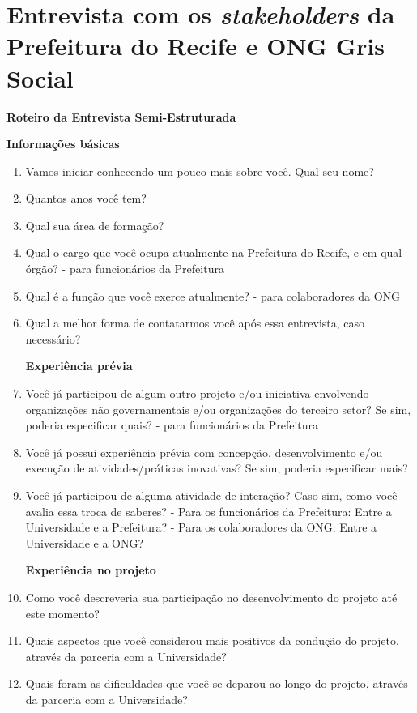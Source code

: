 \chapter{Entrevista com os \textit{stakeholders} da Prefeitura do Recife e ONG Gris Social} 
\textbf{Roteiro da Entrevista Semi-Estruturada}
\par\vspace{0.5\baselineskip}
\textbf{Informações básicas}
\begin{enumerate}
    \item Vamos iniciar conhecendo um pouco mais sobre você. Qual seu nome?
    \item Quantos anos você tem?
    \item Qual sua área de formação?
    \item Qual o cargo que você ocupa atualmente na Prefeitura do Recife, e em qual órgão? - para funcionários da Prefeitura
    \item Qual é a função que você exerce atualmente? - para colaboradores da \gls{ONG}
    \item Qual a melhor forma de contatarmos você após essa entrevista, caso necessário?
\par\vspace{0.5\baselineskip}
\textbf{Experiência prévia}
    \item Você já participou de algum outro projeto e/ou iniciativa envolvendo organizações não governamentais e/ou organizações do terceiro setor? Se sim, poderia especificar quais? - para funcionários da Prefeitura
    \item Você já possui experiência prévia com concepção, desenvolvimento e/ou execução de atividades/práticas inovativas? Se sim, poderia especificar mais?
    \item Você já participou de alguma atividade de interação? Caso sim, como você avalia essa troca de saberes?
    - Para os funcionários da Prefeitura: Entre a Universidade e a Prefeitura?
    - Para os colaboradores da \gls{ONG}: Entre a Universidade e a ONG?
\par\vspace{0.5\baselineskip}
\textbf{Experiência no projeto}
    \item Como você descreveria sua participação no desenvolvimento do projeto até este momento?
    \item Quais aspectos que você considerou mais positivos da condução do projeto, através da parceria com a Universidade?
    \item Quais foram as dificuldades que você se deparou ao longo do projeto, através da parceria com a Universidade?

\end{enumerate}
